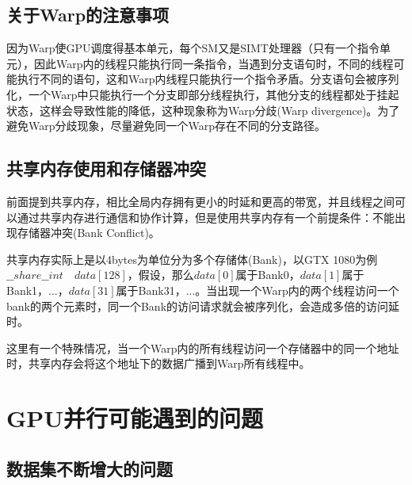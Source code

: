 
\subsection{关于Warp的注意事项}

因为Warp使GPU调度得基本单元，每个SM又是SIMT处理器（只有一个指令单元），因此Warp内的线程只能执行同一条指令，当遇到分支语句时，不同的线程可能执行不同的语句，这和Warp内线程只能执行一个指令矛盾。分支语句会被序列化，一个Warp中只能执行一个分支即部分线程执行，其他分支的线程都处于挂起状态，这样会导致性能的降低，这种现象称为Warp分歧(Warp divergence)。为了避免Warp分歧现象，尽量避免同一个Warp存在不同的分支路径。

{\color{red}{序列化这个东西是编译器处理还是CUDA执行单元处理的}}

\subsection{共享内存使用和存储器冲突}

前面提到共享内存，相比全局内存拥有更小的时延和更高的带宽，并且线程之间可以通过共享内存进行通信和协作计算，但是使用共享内存有一个前提条件：不能出现存储器冲突(Bank Conflict)。

共享内存实际上是以4bytes为单位分为多个存储体(Bank)，以GTX 1080为例 $\_\_share\_\_ int\quad data[128]$，假设，那么$data[0]$属于Bank0，$data[1]$属于Bank1，...，$data[31]$属于Bank31，...。当出现一个Warp内的两个线程访问一个bank的两个元素时，同一个Bank的访问请求就会被序列化，会造成多倍的访问延时。

这里有一个特殊情况，当一个Warp内的所有线程访问一个存储器中的同一个地址时，共享内存会将这个地址下的数据广播到Warp所有线程中。

{\color{red}{检查一下代码有没有这样的问题，通过下面这个地址自查一下}}
\section{GPU并行可能遇到的问题}

\subsection{数据集不断增大的问题}
\label{cha:chap03:Problemsencountered:BigDataSet}


